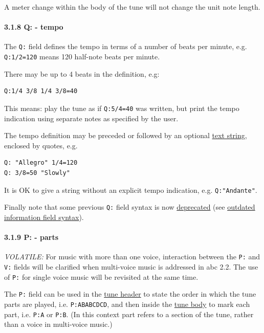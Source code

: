\documentclass[oneside]{book}
\let\oldparagraph\paragraph
\renewcommand{\paragraph}[1]{\oldparagraph{#1}\mbox{}}
\begin{document}
A meter change within the body of the tune will not change the unit note
length.

\hypertarget{qtempo}{\paragraph{3.1.8 Q: - tempo}\label{qtempo}}

The \texttt{Q:} field defines the tempo in terms of a number of beats
per minute, e.g. \texttt{Q:1/2=120} means 120 half-note beats per
minute.

There may be up to 4 beats in the definition, e.g:

\begin{verbatim}
Q:1/4 3/8 1/4 3/8=40
\end{verbatim}

This means: play the tune as if \texttt{Q:5/4=40} was written, but print
the tempo indication using separate notes as specified by the user.

The tempo definition may be preceded or followed by an optional
\protect\hyperlink{text_string_definition}{text string}, enclosed by
quotes, e.g.

\begin{verbatim}
Q: "Allegro" 1/4=120
Q: 3/8=50 "Slowly"
\end{verbatim}

It is OK to give a string without an explicit tempo indication, e.g.
\texttt{Q:"Andante"}.

Finally note that some previous \texttt{Q:} field syntax is now
\protect\hyperlink{outdated_syntax}{deprecated} (see
\protect\hyperlink{outdated_information_field_syntax}{outdated
information field syntax}).

\hypertarget{pparts}{\paragraph{3.1.9 P: - parts}\label{pparts}}

\emph{VOLATILE:} For music with more than one voice, interaction between
the \texttt{P:} and \texttt{V:} fields will be clarified when
multi-voice music is addressed in abc 2.2. The use of \texttt{P:} for
single voice music will be revisited at the same time.

The \texttt{P:} field can be used in the
\protect\hyperlink{tune_header_definition}{tune header} to state the
order in which the tune parts are played, i.e. \texttt{P:ABABCDCD}, and
then inside the \protect\hyperlink{tune_body_definition}{tune body} to
mark each part, i.e. \texttt{P:A} or \texttt{P:B}. (In this context part
refers to a section of the tune, rather than a voice in multi-voice
music.)
\end{document}
